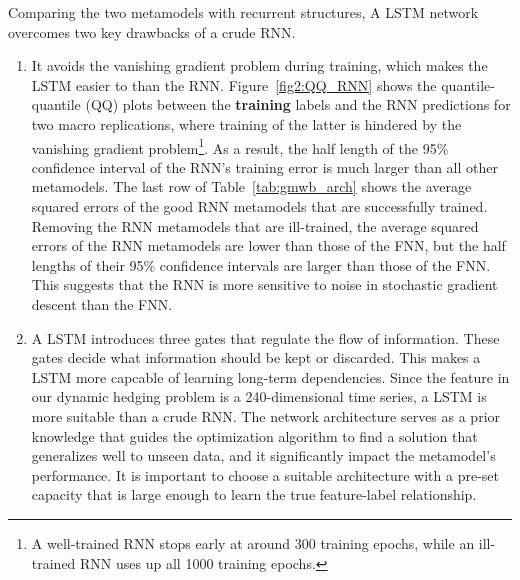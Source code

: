 Comparing the two metamodels with recurrent structures, A LSTM network overcomes two key drawbacks of a crude RNN.
\begin{enumerate}
    \item It avoids the vanishing gradient problem during training, which makes the LSTM easier to than the RNN. Figure~\ref{fig2:QQ_RNN} shows the quantile-quantile (QQ) plots between the \textbf{training} labels and the RNN predictions for two macro replications, where training of the latter is hindered by the vanishing gradient problem\footnote{A well-trained RNN stops early at around 300 training epochs, while an ill-trained RNN uses up all 1000 training epochs.}. 
    As a result, the half length of the 95\% confidence interval of the RNN's training error is much larger than all other metamodels. The last row of Table~\ref{tab:gmwb_arch} shows the average squared errors of the good RNN metamodels that are successfully trained. 
    Removing the RNN metamodels that are ill-trained, the average squared errors of the RNN metamodels are lower than those of the FNN, but the half lengths of their 95\% confidence intervals are larger than those of the FNN. 
    This suggests that the RNN is more sensitive to noise in stochastic gradient descent than the FNN.
    \item A LSTM introduces three gates that regulate the flow of information. 
    These gates decide what information should be kept or discarded. This makes a LSTM more capcable of learning long-term dependencies. 
    Since the feature in our dynamic hedging problem is a 240-dimensional time series, a LSTM is more suitable than a crude RNN.
    The network architecture serves as a prior knowledge that guides the optimization algorithm to find a solution that generalizes well to unseen data, and it significantly impact the metamodel's performance.
    It is important to choose a suitable architecture with a pre-set capacity that is large enough to learn the true feature-label relationship.
\end{enumerate}


